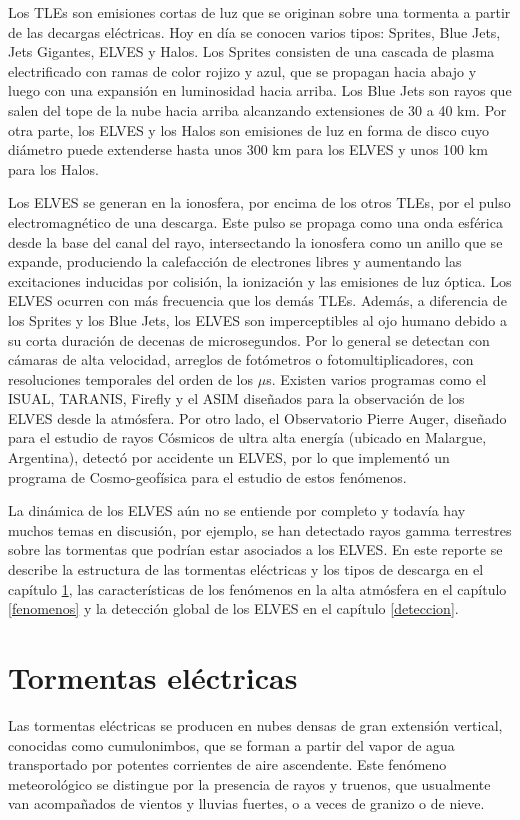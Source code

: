 \documentclass[12pt,oneside,openany,letter]{book}
\begin{document}
Los TLEs son emisiones cortas de luz que se originan sobre una tormenta a partir de las decargas el\'ectricas. Hoy en d\'ia se conocen varios tipos: Sprites, Blue Jets, Jets Gigantes, ELVES y Halos. Los Sprites consisten de una cascada de plasma electrificado con ramas de color rojizo y azul, que se propagan hacia abajo y luego con una expansi\'on en luminosidad hacia arriba. Los Blue Jets son rayos que salen del tope de la nube hacia arriba alcanzando extensiones de 30 a 40 km. Por otra parte, los ELVES y los Halos son emisiones de luz en forma de disco cuyo di\'ametro puede extenderse hasta unos 300 km para los ELVES y unos 100 km para los Halos. 

Los ELVES se generan en la ionosfera, por encima de los otros TLEs, por el pulso electromagnético de una descarga. Este pulso se propaga como una onda esférica desde la base del canal del rayo, intersectando la ionosfera como un anillo que se expande, produciendo la calefacci\'on de electrones libres y aumentando las excitaciones inducidas por colisi\'on, la ionizaci\'on y las emisiones de luz \'optica. Los ELVES ocurren con m\'as frecuencia que los dem\'as TLEs. Adem\'as, a diferencia de los Sprites y los Blue Jets, los ELVES son imperceptibles al ojo humano debido a su corta duraci\'on de decenas de microsegundos. Por lo general se detectan con c\'amaras de alta velocidad, arreglos de fot\'ometros o fotomultiplicadores, con resoluciones temporales del orden de los $\mu$s. Existen varios programas como el ISUAL, TARANIS, Firefly y el ASIM diseñados para la observación de los ELVES desde la atm\'osfera. Por otro lado, el Observatorio Pierre Auger, diseñado para el estudio de rayos Cósmicos de ultra alta energía (ubicado en Malargue, Argentina), detectó por accidente un ELVES, por lo que implementó un programa de Cosmo-geofísica para el estudio de estos fenómenos. 

La dinámica de los ELVES aún no se entiende por completo y todavía hay muchos temas en discusión, por ejemplo, se han detectado rayos gamma terrestres sobre las tormentas que podrían estar asociados a los ELVES. En este reporte se describe la estructura de las tormentas eléctricas y los tipos de descarga en el capítulo \ref{tormentas}, las características de los fenómenos en la alta atmósfera en el capítulo \ref{fenomenos} y la detección global de los ELVES en el capítulo \ref{deteccion}. 

\chapter{Tormentas eléctricas}\label{tormentas}
Las tormentas eléctricas se producen en nubes densas de gran extensión vertical, conocidas como cumulonimbos, que se forman a partir del vapor de agua transportado por potentes corrientes de aire ascendente. Este fenómeno meteorológico se distingue por la presencia de rayos y truenos, que usualmente van acompañados de vientos y lluvias fuertes, o a veces de granizo o de nieve. 
\end{document}
